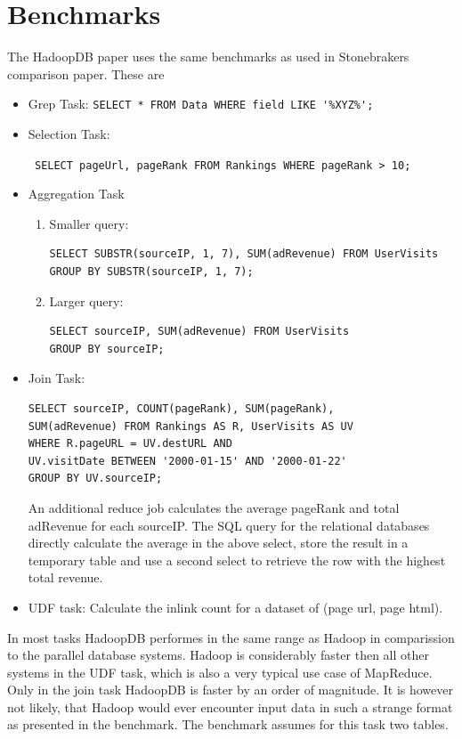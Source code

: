 \documentclass[12pt,a4paper]{scrartcl}		%
\begin{document}
\section{Benchmarks}
The HadoopDB paper uses the same benchmarks as used in Stonebrakers comparison paper. These are
\begin{itemize}
\item Grep Task: \verb+SELECT * FROM Data WHERE field LIKE '%XYZ%';+
\item Selection Task: 

\verb+ SELECT pageUrl, pageRank FROM Rankings WHERE pageRank > 10;+
\item Aggregation Task
  \begin{enumerate}
  \item Smaller query:
\begin{verbatim}
SELECT SUBSTR(sourceIP, 1, 7), SUM(adRevenue) FROM UserVisits 
GROUP BY SUBSTR(sourceIP, 1, 7);
\end{verbatim}

  \item Larger query:
\begin{verbatim}
SELECT sourceIP, SUM(adRevenue) FROM UserVisits 
GROUP BY sourceIP;
\end{verbatim}

  \end{enumerate}
  \item Join Task:
\begin{verbatim}
SELECT sourceIP, COUNT(pageRank), SUM(pageRank),
SUM(adRevenue) FROM Rankings AS R, UserVisits AS UV
WHERE R.pageURL = UV.destURL AND
UV.visitDate BETWEEN '2000-01-15' AND '2000-01-22'
GROUP BY UV.sourceIP;
\end{verbatim}
An additional reduce job calculates the average pageRank and total adRevenue for each sourceIP. The SQL query for the relational databases directly calculate the average in the above select, store the result in a temporary table and use a second select to retrieve the row with the highest total revenue.
  \item UDF task: Calculate the inlink count for a dataset of (page url, page html).
\end{itemize}
In most tasks HadoopDB performes in the same range as Hadoop in comparission to the parallel database systems. Hadoop is considerably faster then all other systems in the UDF task, which is also a very typical use case of MapReduce. Only in the join task HadoopDB is faster by an order of magnitude.
It is however not likely, that Hadoop would ever encounter input data in such a strange format as presented in the benchmark. The benchmark assumes for this task two tables.
\end{document}
